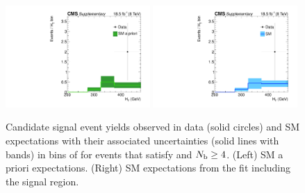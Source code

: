 \begin{figure}[h!]
  \begin{center}
    \includegraphics[width=0.49\textwidth,page=1]{figures/fit_result/bestFit_2012dev_RQcdZero_fZinvAll_ge4b_ge4j-1_smOnly} 
    \includegraphics[width=0.49\textwidth,page=1]{figures/fit_result/bestFit_2012dev_RQcdZero_fZinvAll_ge4b_ge4j-1h_smOnly} \\
    \caption{\label{fig:best-fit-0b} Candidate signal event yields
      observed in data (solid circles) and SM expectations with their
      associated uncertainties (solid lines with bands) in bins of
      \scalht for events that satisfy \njethigh and $N_{\text{b}} \geq
      4$. (Left) SM a priori expectations. (Right) SM expectations
      from the fit including the signal region. }
  \end{center}
\end{figure}


%
